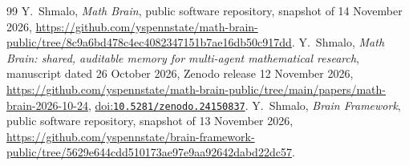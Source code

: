 \documentclass[11pt]{amsart}
\theoremstyle{definition}
\theoremstyle{remark}
\newcommand{\doi}[1]{\href{https://doi.org/#1}{doi:\nolinkurl{#1}}}
\begin{document}
\begin{thebibliography}{99}
 Y.~Shmalo, \emph{Math Brain}, public software repository, snapshot of 14 November 2026,
\url{https://github.com/yspennstate/math-brain-public/tree/8c9a6bd478c4ec4082347151b7ae16db50c917dd}.
 Y.~Shmalo, \emph{Math Brain: shared, auditable memory for multi-agent mathematical research},
manuscript dated 26 October 2026, Zenodo release 12 November 2026,
\url{https://github.com/yspennstate/math-brain-public/tree/main/papers/math-brain-2026-10-24},
\doi{10.5281/zenodo.24150837}.
 Y.~Shmalo, \emph{Brain Framework}, public software repository, snapshot of 13 November 2026,
\url{https://github.com/yspennstate/brain-framework-public/tree/5629e644cdd510173ae97e9aa92642dabd22dc57}.
\end{thebibliography}
\end{document}
